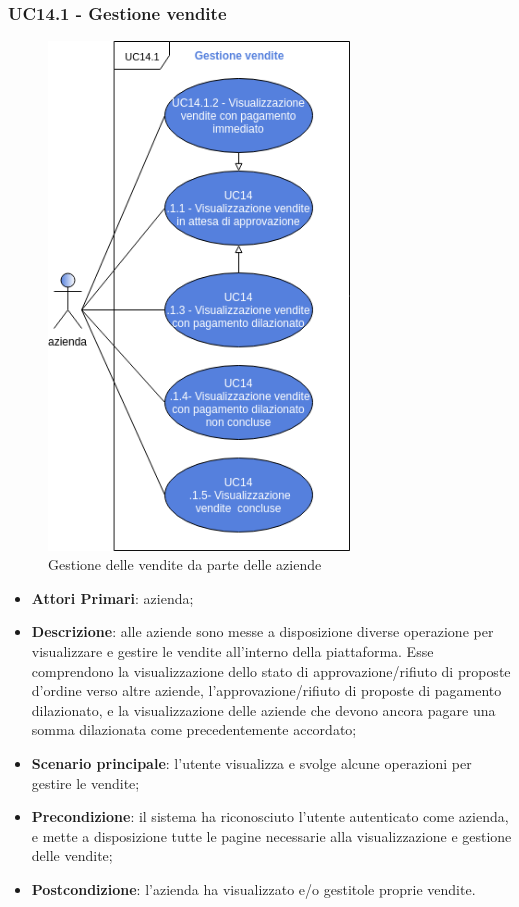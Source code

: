 \subsubsection{UC14.1 - Gestione vendite}
\begin{figure}[H]
	\includegraphics[width=8cm]{res/images/UC14-Vendite.png}
	\centering
	\caption{Gestione delle vendite da parte delle aziende}
\end{figure}
\begin{itemize}
	\item \textbf{Attori Primari}: azienda;
	\item \textbf{Descrizione}: alle aziende sono messe a disposizione diverse operazione per visualizzare e gestire le vendite all'interno della piattaforma. Esse comprendono la visualizzazione dello stato di approvazione/rifiuto di proposte d'ordine verso altre aziende, l'approvazione/rifiuto di proposte di pagamento dilazionato, e la visualizzazione delle aziende che devono ancora pagare una somma dilazionata come precedentemente accordato;
	\item \textbf{Scenario principale}: l'utente visualizza e svolge alcune operazioni per gestire le vendite;
	\item \textbf{Precondizione}: il sistema ha riconosciuto l'utente autenticato come azienda, e mette a disposizione tutte le pagine necessarie alla visualizzazione e gestione delle vendite;
	\item \textbf{Postcondizione}: l'azienda ha visualizzato e/o gestitole proprie vendite.
\end{itemize} 

